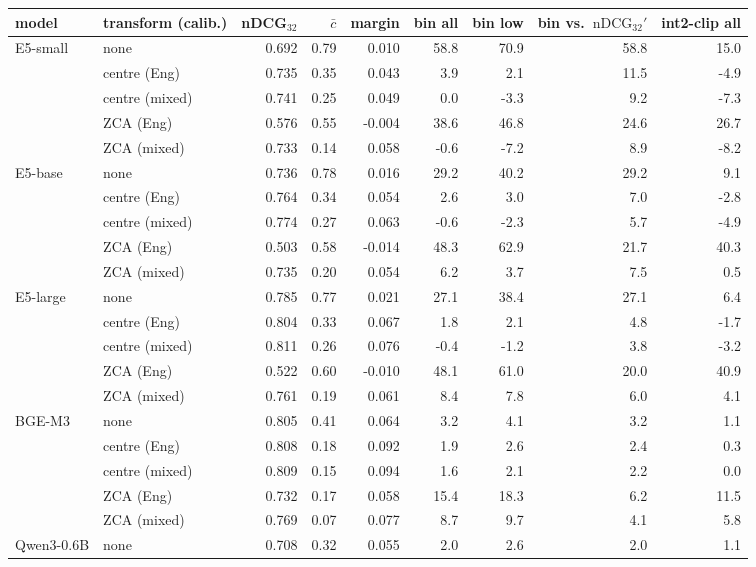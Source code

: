 \begin{table}[t]\centering\footnotesize
\begin{tabular}{llrrrrrrr}
\toprule
model & transform (calib.) & nDCG$_{32}$ & $\bar{c}$ & margin & bin all & bin low & bin vs.\ $\mathrm{nDCG}_{32}'$ & int2-clip all \\
\midrule
E5-small & none & 0.692 & 0.79 & 0.010 & 58.8 & 70.9 & 58.8 & 15.0 \\
 & centre (Eng) & 0.735 & 0.35 & 0.043 & 3.9 & 2.1 & 11.5 & -4.9 \\
 & centre (mixed) & 0.741 & 0.25 & 0.049 & 0.0 & -3.3 & 9.2 & -7.3 \\
 & ZCA (Eng) & 0.576 & 0.55 & -0.004 & 38.6 & 46.8 & 24.6 & 26.7 \\
 & ZCA (mixed) & 0.733 & 0.14 & 0.058 & -0.6 & -7.2 & 8.9 & -8.2 \\
\midrule
E5-base & none & 0.736 & 0.78 & 0.016 & 29.2 & 40.2 & 29.2 & 9.1 \\
 & centre (Eng) & 0.764 & 0.34 & 0.054 & 2.6 & 3.0 & 7.0 & -2.8 \\
 & centre (mixed) & 0.774 & 0.27 & 0.063 & -0.6 & -2.3 & 5.7 & -4.9 \\
 & ZCA (Eng) & 0.503 & 0.58 & -0.014 & 48.3 & 62.9 & 21.7 & 40.3 \\
 & ZCA (mixed) & 0.735 & 0.20 & 0.054 & 6.2 & 3.7 & 7.5 & 0.5 \\
\midrule
E5-large & none & 0.785 & 0.77 & 0.021 & 27.1 & 38.4 & 27.1 & 6.4 \\
 & centre (Eng) & 0.804 & 0.33 & 0.067 & 1.8 & 2.1 & 4.8 & -1.7 \\
 & centre (mixed) & 0.811 & 0.26 & 0.076 & -0.4 & -1.2 & 3.8 & -3.2 \\
 & ZCA (Eng) & 0.522 & 0.60 & -0.010 & 48.1 & 61.0 & 20.0 & 40.9 \\
 & ZCA (mixed) & 0.761 & 0.19 & 0.061 & 8.4 & 7.8 & 6.0 & 4.1 \\
\midrule
BGE-M3 & none & 0.805 & 0.41 & 0.064 & 3.2 & 4.1 & 3.2 & 1.1 \\
 & centre (Eng) & 0.808 & 0.18 & 0.092 & 1.9 & 2.6 & 2.4 & 0.3 \\
 & centre (mixed) & 0.809 & 0.15 & 0.094 & 1.6 & 2.1 & 2.2 & 0.0 \\
 & ZCA (Eng) & 0.732 & 0.17 & 0.058 & 15.4 & 18.3 & 6.2 & 11.5 \\
 & ZCA (mixed) & 0.769 & 0.07 & 0.077 & 8.7 & 9.7 & 4.1 & 5.8 \\
\midrule
Qwen3-0.6B & none & 0.708 & 0.32 & 0.055 & 2.0 & 2.6 & 2.0 & 1.1 \\

\end{tabular}
\end{table}
